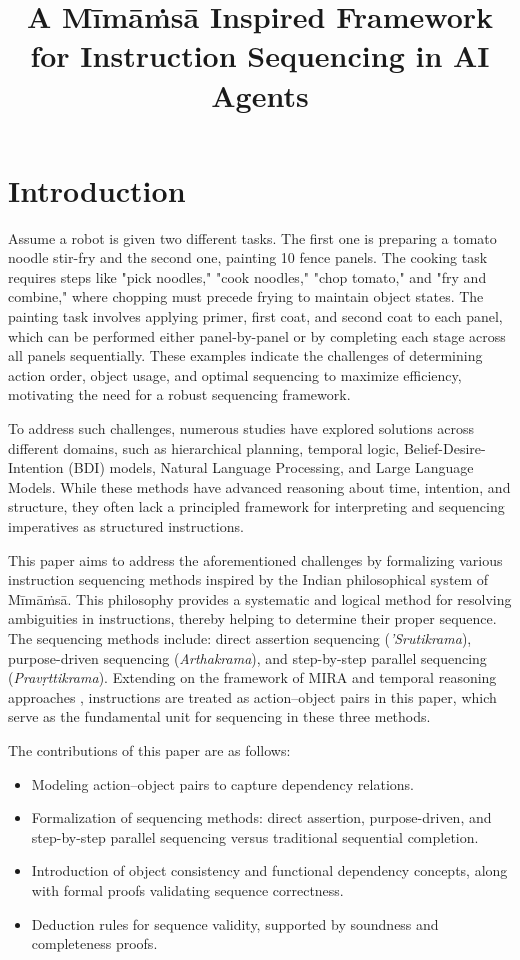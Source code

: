 \documentclass[a4paper,11pt]{lmcs}
\title{A M\={i}m\={a}\.{m}s\={a} Inspired Framework for Instruction Sequencing in AI Agents}
\author{}
\newcommand{\mimamsa}{M\={i}m\={a}\.ms\={a}}
\begin{document}
\maketitle

\begin{abstract}

\end{abstract}

\section{Introduction}
Assume a robot is given two different tasks. The first one is preparing a tomato noodle stir-fry and the second one, painting 10 fence panels. The cooking task requires steps like "pick noodles," "cook noodles," "chop tomato," and "fry and combine," where chopping must precede frying to maintain object states. The painting task involves applying primer, first coat, and second coat to each panel, which can be performed either panel-by-panel or by completing each stage across all panels sequentially. These examples indicate the challenges of determining action order, object usage, and optimal sequencing to maximize efficiency, motivating the need for a robust sequencing framework.

To address such challenges, numerous studies have explored solutions across different domains, such as hierarchical planning, temporal logic, Belief-Desire-Intention (BDI) models, Natural Language Processing, and Large Language Models. While these methods have advanced reasoning about time, intention, and structure, they often lack a principled framework for interpreting and sequencing imperatives as structured instructions.

This paper aims to address the aforementioned challenges by formalizing various instruction sequencing methods inspired by the Indian philosophical system of \mimamsa. This philosophy provides a systematic and logical method for resolving ambiguities in instructions, thereby helping to determine their proper sequence. The sequencing methods include: direct assertion sequencing (\textit{'Srutikrama}), purpose-driven sequencing (\textit{Arthakrama}), and step-by-step parallel sequencing (\textit{Pravṛttikrama}). Extending on the framework of MIRA \citep{mira} and temporal reasoning approaches \citep{llmmira}, instructions are treated as action–object pairs in this paper, which serve as the fundamental unit for sequencing in these three methods.

The contributions of this paper are as follows:
\begin{itemize}
\item Modeling action–object pairs to capture dependency relations.
\item Formalization of sequencing methods: direct assertion, purpose-driven, and step-by-step parallel sequencing versus traditional sequential completion.
\item Introduction of object consistency and functional dependency concepts, along with formal proofs validating sequence correctness.
\item Deduction rules for sequence validity, supported by soundness and completeness proofs.
\end{itemize}
\end{document}

